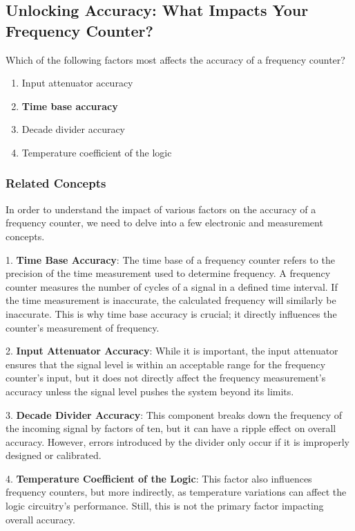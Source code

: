 \subsection{Unlocking Accuracy: What Impacts Your Frequency Counter?}

\begin{tcolorbox}[colback=gray!10, colframe=black, title=E4B01]
Which of the following factors most affects the accuracy of a frequency counter? 
\begin{enumerate}[label=\Alph*.]
    \item Input attenuator accuracy
    \item \textbf{Time base accuracy}
    \item Decade divider accuracy
    \item Temperature coefficient of the logic
\end{enumerate} \end{tcolorbox}

\subsubsection{Related Concepts}

In order to understand the impact of various factors on the accuracy of a frequency counter, we need to delve into a few electronic and measurement concepts.

1. \textbf{Time Base Accuracy}: The time base of a frequency counter refers to the precision of the time measurement used to determine frequency. A frequency counter measures the number of cycles of a signal in a defined time interval. If the time measurement is inaccurate, the calculated frequency will similarly be inaccurate. This is why time base accuracy is crucial; it directly influences the counter's measurement of frequency.

2. \textbf{Input Attenuator Accuracy}: While it is important, the input attenuator ensures that the signal level is within an acceptable range for the frequency counter's input, but it does not directly affect the frequency measurement's accuracy unless the signal level pushes the system beyond its limits.

3. \textbf{Decade Divider Accuracy}: This component breaks down the frequency of the incoming signal by factors of ten, but it can have a ripple effect on overall accuracy. However, errors introduced by the divider only occur if it is improperly designed or calibrated.

4. \textbf{Temperature Coefficient of the Logic}: This factor also influences frequency counters, but more indirectly, as temperature variations can affect the logic circuitry's performance. Still, this is not the primary factor impacting overall accuracy.

